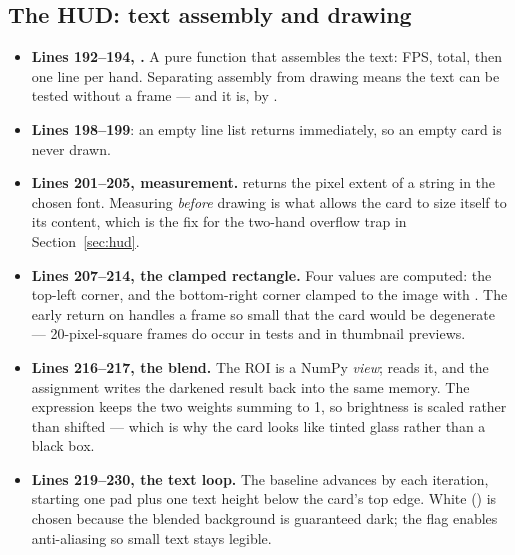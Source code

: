 \subsection{The HUD: text assembly and drawing}

\begin{codecard}

\end{codecard}

\begin{itemize}
  \item \textbf{Lines 192--194, .} A pure function that assembles the text: FPS,
        total, then one line per hand. Separating assembly from drawing means the text can be tested
        without a frame --- and it is, by .
  \item \textbf{Lines 198--199}: an empty line list returns immediately, so an empty card is never
        drawn.
  \item \textbf{Lines 201--205, measurement.}  returns the pixel extent of a
        string in the chosen font. Measuring \emph{before} drawing is what allows the card to size
        itself to its content, which is the fix for the two-hand overflow trap in
        Section~\ref{sec:hud}.
  \item \textbf{Lines 207--214, the clamped rectangle.} Four values are computed: the top-left
        corner, and the bottom-right corner clamped to the image with . The early return on
         handles a frame so small that the card would be degenerate ---
        20-pixel-square frames do occur in tests and in thumbnail previews.
  \item \textbf{Lines 216--217, the blend.} The ROI is a NumPy \emph{view};  reads
        it, and the assignment writes the darkened result back into the same memory. The expression
         keeps the two weights summing to 1, so brightness is scaled rather
        than shifted --- which is why the card looks like tinted glass rather than a black box.
  \item \textbf{Lines 219--230, the text loop.} The baseline advances by  each
        iteration, starting one pad plus one text height below the card's top edge. White
        () is chosen because the blended background is guaranteed dark; the
         flag enables anti-aliasing so small text stays legible.
\end{itemize}

